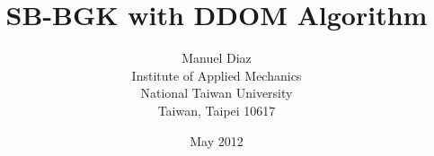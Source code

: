 \documentclass[a4paper]{article}
\begin{document}
\title{SB-BGK with DDOM Algorithm}
\author{Manuel Diaz\\[1ex]
	Institute of Applied Mechanics\\
	National Taiwan University \\
	Taiwan, Taipei 10617
	}
\date{May 2012}
\maketitle

\tableofcontents

%




%

%

%
%
\end{document}
